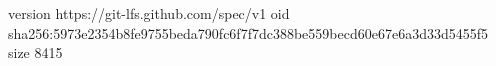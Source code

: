 version https://git-lfs.github.com/spec/v1
oid sha256:5973e2354b8fe9755beda790fc6f7f7dc388be559becd60e67e6a3d33d5455f5
size 8415
